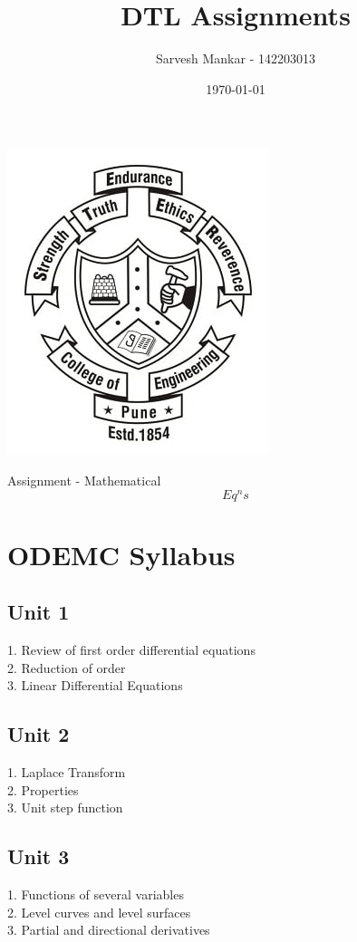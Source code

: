 \documentclass[12pt]{article}
\title{DTL Assignments}
\author{Sarvesh Mankar - 142203013}
\date{\today}
\begin{document}
		\begin{center}
		\includegraphics{COEP-Pune-Logo.jpg}
	\end{center}
	
	\maketitle
	\newpage
	
	\title{}
	\begin{center}{\fontsize{28pt}{28pt}\selectfont Assignment - Mathematical \[ Eq^n s\]\newline}\end{center}
	
	
	
	\section{ODEMC Syllabus}
	\subsection{Unit 1}
	1. Review of first order differential equations\\
	2. Reduction of order\\
	3. Linear Differential Equations\\
	\subsection{Unit 2}
	1. Laplace Transform\\
	2. Properties\\
	3. Unit step function\\
	\subsection{Unit 3}
	1. Functions of several variables \\
	2. Level curves and level surfaces\\
	3. Partial and directional derivatives\\
	
\end{document}
